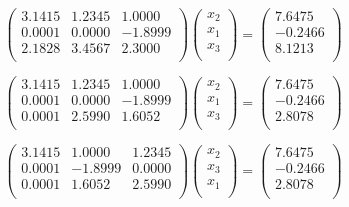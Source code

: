 \documentclass[11pt,a4paper,oneside]{article}
\begin{document}
$$ \left(\begin{matrix}
3.1415 & 1.2345 & 1.0000 \\
0.0001 & 0.0000 & -1.8999 \\
2.1828 & 3.4567 & 2.3000 \\
\end{matrix}\right)
\left(\begin{matrix}
x_2 \\
x_1 \\
x_3 \\
\end{matrix}\right)
=
\left(\begin{matrix}
7.6475 \\
-0.2466 \\
8.1213 \\
\end{matrix}\right) $$

$$ \left(\begin{matrix}
3.1415 & 1.2345 & 1.0000 \\
0.0001 & 0.0000 & -1.8999 \\
0.0001 & 2.5990 & 1.6052 \\
\end{matrix}\right)
\left(\begin{matrix}
x_2 \\
x_1 \\
x_3 \\
\end{matrix}\right)
=
\left(\begin{matrix}
7.6475 \\
-0.2466 \\
2.8078 \\
\end{matrix}\right) $$

$$ \left(\begin{matrix}
3.1415 & 1.0000 & 1.2345 \\
0.0001 & -1.8999 & 0.0000 \\
0.0001 & 1.6052 & 2.5990 \\
\end{matrix}\right)
\left(\begin{matrix}
x_2 \\
x_3 \\
x_1 \\
\end{matrix}\right)
=
\left(\begin{matrix}
7.6475 \\
-0.2466 \\
2.8078 \\
\end{matrix}\right) $$
\end{document}
